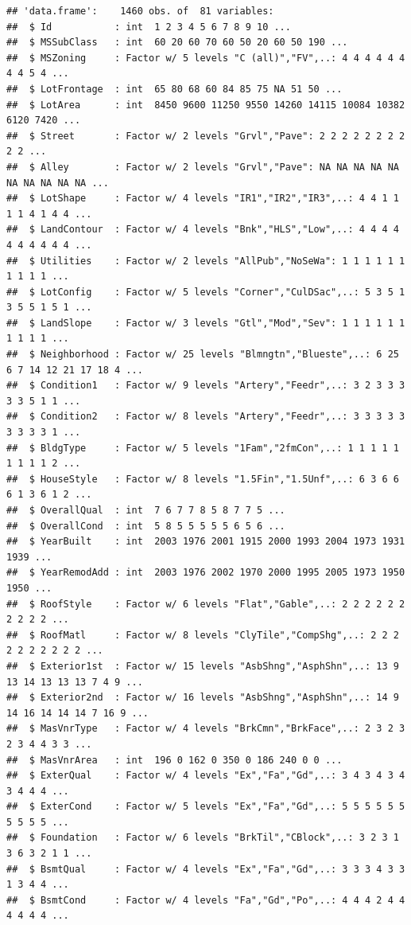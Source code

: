 \documentclass[
]{article}
\begin{document}
\begin{verbatim}
## 'data.frame':    1460 obs. of  81 variables:
##  $ Id           : int  1 2 3 4 5 6 7 8 9 10 ...
##  $ MSSubClass   : int  60 20 60 70 60 50 20 60 50 190 ...
##  $ MSZoning     : Factor w/ 5 levels "C (all)","FV",..: 4 4 4 4 4 4 4 4 5 4 ...
##  $ LotFrontage  : int  65 80 68 60 84 85 75 NA 51 50 ...
##  $ LotArea      : int  8450 9600 11250 9550 14260 14115 10084 10382 6120 7420 ...
##  $ Street       : Factor w/ 2 levels "Grvl","Pave": 2 2 2 2 2 2 2 2 2 2 ...
##  $ Alley        : Factor w/ 2 levels "Grvl","Pave": NA NA NA NA NA NA NA NA NA NA ...
##  $ LotShape     : Factor w/ 4 levels "IR1","IR2","IR3",..: 4 4 1 1 1 1 4 1 4 4 ...
##  $ LandContour  : Factor w/ 4 levels "Bnk","HLS","Low",..: 4 4 4 4 4 4 4 4 4 4 ...
##  $ Utilities    : Factor w/ 2 levels "AllPub","NoSeWa": 1 1 1 1 1 1 1 1 1 1 ...
##  $ LotConfig    : Factor w/ 5 levels "Corner","CulDSac",..: 5 3 5 1 3 5 5 1 5 1 ...
##  $ LandSlope    : Factor w/ 3 levels "Gtl","Mod","Sev": 1 1 1 1 1 1 1 1 1 1 ...
##  $ Neighborhood : Factor w/ 25 levels "Blmngtn","Blueste",..: 6 25 6 7 14 12 21 17 18 4 ...
##  $ Condition1   : Factor w/ 9 levels "Artery","Feedr",..: 3 2 3 3 3 3 3 5 1 1 ...
##  $ Condition2   : Factor w/ 8 levels "Artery","Feedr",..: 3 3 3 3 3 3 3 3 3 1 ...
##  $ BldgType     : Factor w/ 5 levels "1Fam","2fmCon",..: 1 1 1 1 1 1 1 1 1 2 ...
##  $ HouseStyle   : Factor w/ 8 levels "1.5Fin","1.5Unf",..: 6 3 6 6 6 1 3 6 1 2 ...
##  $ OverallQual  : int  7 6 7 7 8 5 8 7 7 5 ...
##  $ OverallCond  : int  5 8 5 5 5 5 5 6 5 6 ...
##  $ YearBuilt    : int  2003 1976 2001 1915 2000 1993 2004 1973 1931 1939 ...
##  $ YearRemodAdd : int  2003 1976 2002 1970 2000 1995 2005 1973 1950 1950 ...
##  $ RoofStyle    : Factor w/ 6 levels "Flat","Gable",..: 2 2 2 2 2 2 2 2 2 2 ...
##  $ RoofMatl     : Factor w/ 8 levels "ClyTile","CompShg",..: 2 2 2 2 2 2 2 2 2 2 ...
##  $ Exterior1st  : Factor w/ 15 levels "AsbShng","AsphShn",..: 13 9 13 14 13 13 13 7 4 9 ...
##  $ Exterior2nd  : Factor w/ 16 levels "AsbShng","AsphShn",..: 14 9 14 16 14 14 14 7 16 9 ...
##  $ MasVnrType   : Factor w/ 4 levels "BrkCmn","BrkFace",..: 2 3 2 3 2 3 4 4 3 3 ...
##  $ MasVnrArea   : int  196 0 162 0 350 0 186 240 0 0 ...
##  $ ExterQual    : Factor w/ 4 levels "Ex","Fa","Gd",..: 3 4 3 4 3 4 3 4 4 4 ...
##  $ ExterCond    : Factor w/ 5 levels "Ex","Fa","Gd",..: 5 5 5 5 5 5 5 5 5 5 ...
##  $ Foundation   : Factor w/ 6 levels "BrkTil","CBlock",..: 3 2 3 1 3 6 3 2 1 1 ...
##  $ BsmtQual     : Factor w/ 4 levels "Ex","Fa","Gd",..: 3 3 3 4 3 3 1 3 4 4 ...
##  $ BsmtCond     : Factor w/ 4 levels "Fa","Gd","Po",..: 4 4 4 2 4 4 4 4 4 4 ...

\end{verbatim}
\end{document}
